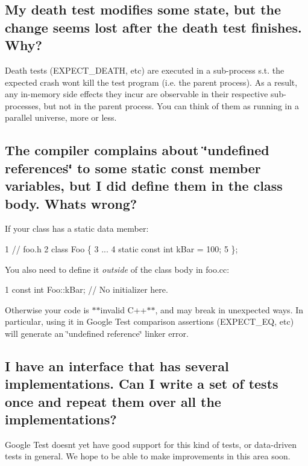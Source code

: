 \subsection*{My death test modifies some state, but the change seems lost after the death test finishes. Why?}

Death tests ({\ttfamily E\+X\+P\+E\+C\+T\+\_\+\+D\+E\+A\+TH}, etc) are executed in a sub-\/process s.\+t. the expected crash won\textquotesingle{}t kill the test program (i.\+e. the parent process). As a result, any in-\/memory side effects they incur are observable in their respective sub-\/processes, but not in the parent process. You can think of them as running in a parallel universe, more or less.

\subsection*{The compiler complains about \char`\"{}undefined references\char`\"{} to some static const member variables, but I did define them in the class body. What\textquotesingle{}s wrong?}

If your class has a static data member\+:


\begin{DoxyCode}
1 // foo.h
2 class Foo \{
3   ...
4   static const int kBar = 100;
5 \};
\end{DoxyCode}


You also need to define it {\itshape outside} of the class body in {\ttfamily foo.\+cc}\+:


\begin{DoxyCode}
1 const int Foo::kBar;  // No initializer here.
\end{DoxyCode}


Otherwise your code is $\ast$$\ast$invalid C++$\ast$$\ast$, and may break in unexpected ways. In particular, using it in Google Test comparison assertions ({\ttfamily E\+X\+P\+E\+C\+T\+\_\+\+EQ}, etc) will generate an \char`\"{}undefined reference\char`\"{} linker error.

\subsection*{I have an interface that has several implementations. Can I write a set of tests once and repeat them over all the implementations?}

Google Test doesn\textquotesingle{}t yet have good support for this kind of tests, or data-\/driven tests in general. We hope to be able to make improvements in this area soon.

